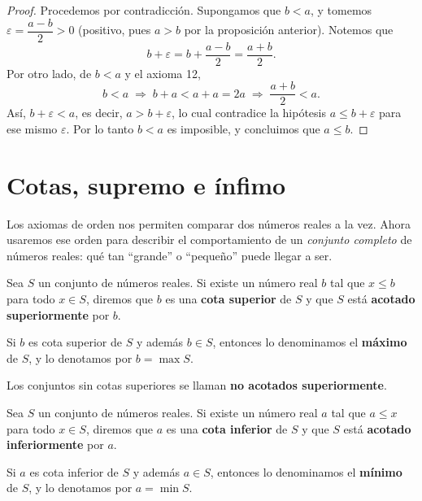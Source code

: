 \documentclass[12pt,a4paper]{book}
\begin{document}
  \begin{proof}
    Procedemos por contradicción. Supongamos que $b<a$, y tomemos $\varepsilon = \dfrac{a-b}{2}>0$ (positivo, pues $a>b$ por la proposición anterior). Notemos que
    \begin{equation*}
      b+\varepsilon = b+\frac{a-b}{2} = \frac{a+b}{2}.
    \end{equation*}
    Por otro lado, de $b<a$ y el axioma 12,
    \begin{equation*}
      b<a \;\Rightarrow\; b+a<a+a=2a \;\Rightarrow\; \frac{a+b}{2}<a.
    \end{equation*}
    Así, $b+\varepsilon<a$, es decir, $a>b+\varepsilon$, lo cual contradice la hipótesis $a\leq b+\varepsilon$ para ese mismo $\varepsilon$. Por lo tanto $b<a$ es imposible, y concluimos que $a \leq b$.
  \end{proof}
  
  \section{Cotas, supremo e ínfimo}
  
  Los axiomas de orden nos permiten comparar dos números reales a la vez. Ahora usaremos ese orden para describir el comportamiento de un \emph{conjunto completo} de números reales: qué tan ``grande'' o ``pequeño'' puede llegar a ser.
  
  \begin{definicion}
    Sea $S$ un conjunto de números reales. Si existe un número real $b$ tal que $x\leq b$ para todo $x\in S$, diremos que $b$ es una \textbf{cota superior} de $S$ y que $S$ está \textbf{acotado superiormente} por $b$.
  
    Si $b$ es cota superior de $S$ y además $b\in S$, entonces lo denominamos el \textbf{máximo} de $S$, y lo denotamos por $b=\max S$.
  \end{definicion}
  
  Los conjuntos sin cotas superiores se llaman \textbf{no acotados superiormente}.
  
  \begin{definicion}
    Sea $S$ un conjunto de números reales. Si existe un número real $a$ tal que $a\leq x$ para todo $x\in S$, diremos que $a$ es una \textbf{cota inferior} de $S$ y que $S$ está \textbf{acotado inferiormente} por $a$.
  
    Si $a$ es cota inferior de $S$ y además $a\in S$, entonces lo denominamos el \textbf{mínimo} de $S$, y lo denotamos por $a=\min S$.
  \end{definicion}
  
\end{document}
